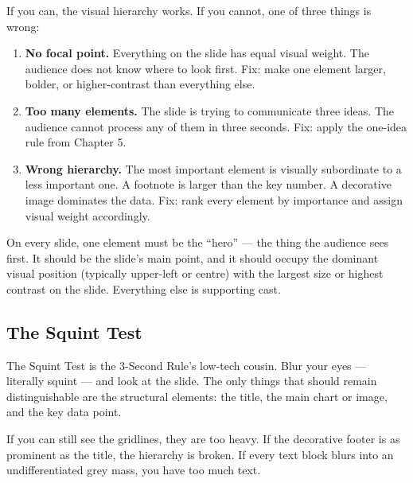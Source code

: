 If you can, the visual hierarchy works. If you cannot, one of three things is wrong:

\begin{enumerate}
  \item \textbf{No focal point.} Everything on the slide has equal visual weight. The audience does not know where to look first. Fix: make one element larger, bolder, or higher-contrast than everything else.
  \item \textbf{Too many elements.} The slide is trying to communicate three ideas. The audience cannot process any of them in three seconds. Fix: apply the one-idea rule from Chapter 5.
  \item \textbf{Wrong hierarchy.} The most important element is visually subordinate to a less important one. A footnote is larger than the key number. A decorative image dominates the data. Fix: rank every element by importance and assign visual weight accordingly.
\end{enumerate}

\begin{keybox}
On every slide, one element must be the ``hero'' --- the thing the audience sees first. It should be the slide's main point, and it should occupy the dominant visual position (typically upper-left or centre) with the largest size or highest contrast on the slide. Everything else is supporting cast.
\end{keybox}


\subsection{The Squint Test}

The Squint Test is the 3-Second Rule's low-tech cousin. Blur your eyes --- literally squint --- and look at the slide. The only things that should remain distinguishable are the structural elements: the title, the main chart or image, and the key data point.

If you can still see the gridlines, they are too heavy. If the decorative footer is as prominent as the title, the hierarchy is broken. If every text block blurs into an undifferentiated grey mass, you have too much text.

